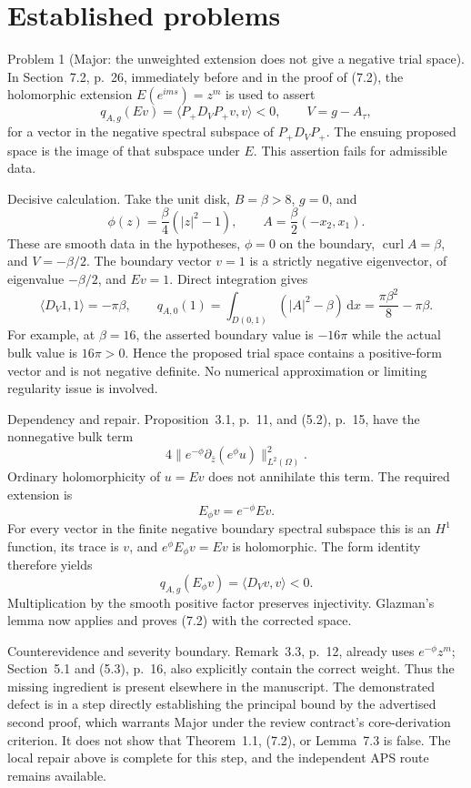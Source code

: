 \documentclass[10pt]{article}
\begin{document}
\section*{Established problems}
Problem 1 (Major: the unweighted extension does not give a negative trial space).  In Section 7.2, p. 26, immediately before and in the proof of (7.2), the holomorphic extension \(E(e^{ims})=z^m\) is used to assert \[q_{A,g}(Ev)=\langle P_+D_VP_+v,v\rangle<0,
 \qquad V=g-A_\tau,\] for a vector in the negative spectral subspace of \(P_+D_VP_+\). The ensuing proposed space is the image of that subspace under \(E\). This assertion fails for admissible data.\par
Decisive calculation. Take the unit disk, \(B=\beta>8\), \(g=0\), and \[\phi(z)=\frac{\beta}{4}(|z|^2-1),\qquad
 A=\frac{\beta}{2}(-x_2,x_1).\] These are smooth data in the hypotheses, \(\phi=0\) on the boundary, \(\operatorname{curl}A=\beta\), and \(V=-\beta/2\). The boundary vector \(v=1\) is a strictly negative eigenvector, of eigenvalue \(-\beta/2\), and \(Ev=1\). Direct integration gives \[\langle D_V1,1\rangle=-\pi\beta,\qquad
 q_{A,0}(1)=\int_{D(0,1)}(|A|^2-\beta)\,\mathrm dx
             =\frac{\pi\beta^2}{8}-\pi\beta .\] For example, at \(\beta=16\), the asserted boundary value is \(-16\pi\) while the actual bulk value is \(16\pi>0\). Hence the proposed trial space contains a positive-form vector and is not negative definite. No numerical approximation or limiting regularity issue is involved.\par
Dependency and repair. Proposition 3.1, p. 11, and (5.2), p. 15, have the nonnegative bulk term \[4\|e^{-\phi}\partial_{\bar z}(e^\phi u)\|_{L^2(\Omega)}^2 .\] Ordinary holomorphicity of \(u=Ev\) does not annihilate this term. The required extension is \[E_\phi v=e^{-\phi}Ev .\] For every vector in the finite negative boundary spectral subspace this is an \(H^1\) function, its trace is \(v\), and \(e^\phi E_\phi v=Ev\) is holomorphic. The form identity therefore yields \[q_{A,g}(E_\phi v)=\langle D_Vv,v\rangle<0 .\] Multiplication by the smooth positive factor preserves injectivity. Glazman’s lemma now applies and proves (7.2) with the corrected space.\par
Counterevidence and severity boundary. Remark 3.3, p. 12, already uses \(e^{-\phi}z^m\); Section 5.1 and (5.3), p. 16, also explicitly contain the correct weight. Thus the missing ingredient is present elsewhere in the manuscript. The demonstrated defect is in a step directly establishing the principal bound by the advertised second proof, which warrants Major under the review contract’s core-derivation criterion. It does not show that Theorem 1.1, (7.2), or Lemma 7.3 is false. The local repair above is complete for this step, and the independent APS route remains available.\par
\end{document}
